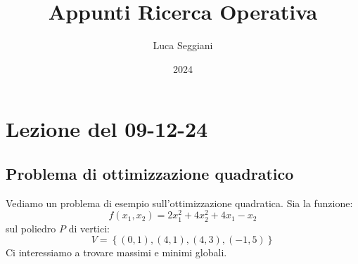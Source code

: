 \documentclass[a4paper,11pt]{article}
\title{Appunti Ricerca Operativa}
\author{Luca Seggiani}
\date{2024}
\begin{document}
\section{Lezione del 09-12-24}

\thispagestyle{empty}
\pagestyle{fancy}

\subsection{Problema di ottimizzazione quadratico}
Vediamo un problema di esempio sull'ottimizzazione quadratica.
Sia la funzione:
$$
f(x_1, x_2) = 2x_1^2 + 4x_2^2 + 4x_1 - x_2
$$
sul poliedro $P$ di vertici:
$$
V = \left\{ (0, 1), (4, 1), (4, 3), (-1, 5) \right\}
$$
Ci interessiamo a trovare massimi e minimi globali.
\end{document}
